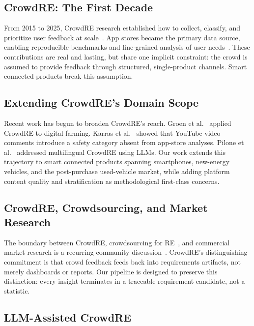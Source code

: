 \documentclass[conference]{IEEEtran}
\begin{document}
\subsection{CrowdRE: The First Decade}

From 2015 to 2025, CrowdRE research established how to collect, classify, and prioritize user feedback at scale~\cite{Groen2017,Groen2015,Wouters2022}. App stores became the primary data source, enabling reproducible benchmarks and fine-grained analysis of user needs~\cite{Maalej2015,Guzman2014,Iacob2013}. These contributions are real and lasting, but share one implicit constraint: the crowd is assumed to provide feedback through structured, single-product channels. Smart connected products break this assumption.

\subsection{Extending CrowdRE's Domain Scope}

Recent work has begun to broaden CrowdRE's reach. Groen et al.~\cite{Groen2024} applied CrowdRE to digital farming. Karras et al.~\cite{Karras2021} showed that YouTube video comments introduce a safety category absent from app-store analyses. Pilone et al.~\cite{Pilone2024} addressed multilingual CrowdRE using LLMs. Our work extends this trajectory to smart connected products spanning smartphones, new-energy vehicles, and the post-purchase used-vehicle market, while adding platform content quality and stratification as methodological first-class concerns.

\subsection{CrowdRE, Crowdsourcing, and Market Research}

The boundary between CrowdRE, crowdsourcing for RE~\cite{Hosseini2014}, and commercial market research is a recurring community discussion~\cite{Groen2017}. CrowdRE's distinguishing commitment is that crowd feedback feeds back into requirements artifacts, not merely dashboards or reports. Our pipeline is designed to preserve this distinction: every insight terminates in a traceable requirement candidate, not a statistic.

\subsection{LLM-Assisted CrowdRE}
\end{document}
